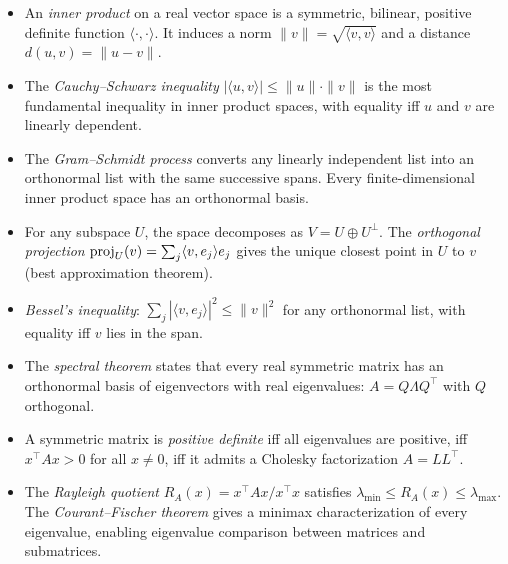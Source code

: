 \documentclass[11pt,a4paper]{article}
\begin{document}
\begin{itemize}
  \item An \emph{inner product} on a real vector space is a symmetric,
        bilinear, positive definite function $\langle \cdot, \cdot \rangle$.
        It induces a norm $\|v\| = \sqrt{\langle v, v \rangle}$ and a
        distance $d(u,v) = \|u - v\|$.

  \item The \emph{Cauchy--Schwarz inequality}
        $|\langle u, v \rangle| \leq \|u\| \cdot \|v\|$ is the most
        fundamental inequality in inner product spaces, with equality iff
        $u$ and $v$ are linearly dependent.

  \item The \emph{Gram--Schmidt process} converts any linearly independent
        list into an orthonormal list with the same successive spans.
        Every finite-dimensional inner product space has an orthonormal
        basis.

  \item For any subspace $U$, the space decomposes as
        $V = U \oplus U^\perp$.  The \emph{orthogonal projection}
        $\operatorname{proj}_U(v) = \sum_j \langle v, e_j \rangle e_j$ gives the unique
        closest point in $U$ to $v$ (best approximation theorem).

  \item \emph{Bessel's inequality}:
        $\sum_j |\langle v, e_j \rangle|^2 \leq \|v\|^2$ for any
        orthonormal list, with equality iff $v$ lies in the span.

  \item The \emph{spectral theorem} states that every real symmetric
        matrix has an orthonormal basis of eigenvectors with real
        eigenvalues: $A = Q\Lambda Q^\top$ with $Q$ orthogonal.

  \item A symmetric matrix is \emph{positive definite} iff all eigenvalues
        are positive, iff $x^\top Ax > 0$ for all $x \neq 0$, iff it admits
        a Cholesky factorization $A = LL^\top$.

  \item The \emph{Rayleigh quotient} $R_A(x) = x^\top Ax / x^\top x$
        satisfies $\lambda_{\min} \leq R_A(x) \leq \lambda_{\max}$.  The
        \emph{Courant--Fischer theorem} gives a minimax characterization
        of every eigenvalue, enabling eigenvalue comparison between matrices
        and submatrices.
\end{itemize}
\end{document}
